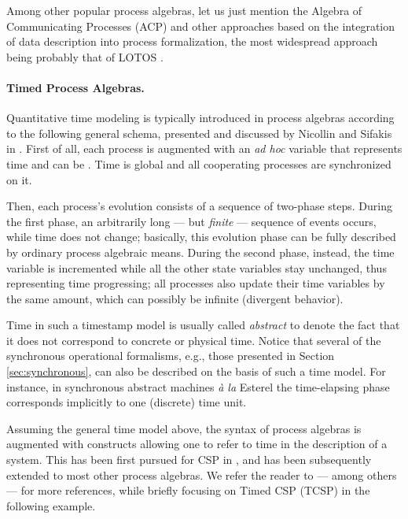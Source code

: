 Among other popular process algebras, let us just mention the 
Algebra of Communicating Processes (ACP) \cite{BW90} and other approaches 
based on the integration of data description into process formalization, 
the most widespread approach being probably that of LOTOS \cite{vEVD89,Bri89}.


\paragraph{Timed Process Algebras.}
Quantitative time modeling is typically introduced in process 
algebras according to the following general schema, presented 
and discussed by Nicollin and Sifakis in \cite{NS91}. First of all, 
each process is augmented with an \emph{ad hoc} variable that  
represents time and can be . Time is global and all cooperating processes 
are synchronized on it. 

Then, each process's evolution consists of a sequence of two-phase 
steps. During the first phase, an arbitrarily long --- but \emph{finite} 
--- sequence of events occurs, while time does not change; basically, 
this evolution phase can be fully described by ordinary process 
algebraic means. During the second phase, instead, the time variable 
is incremented while all the other state variables stay unchanged, 
thus representing time progressing; all processes also  
update their time variables by the same amount, which can possibly 
be infinite (divergent behavior).

Time in such a timestamp model is usually called \emph{abstract} 
to denote the fact that it does not correspond to concrete or 
physical time. Notice that several of the synchronous operational 
formalisms, e.g., those presented in Section \ref{sec:synchronous}, can also 
be described on the basis of such a time model. For instance, 
in synchronous abstract machines \emph{\`{a} la} Esterel \cite{BG92} the 
time-elapsing phase corresponds implicitly to one (discrete) 
time unit.

Assuming the general time model above, the syntax of process 
algebras is augmented with constructs allowing one to  
refer to  time in the description of a system. This 
has been first pursued for CSP in \cite{RR88}, and has been subsequently 
extended to most other process algebras. We refer the reader 
to \cite{BM02,NS91,Bae03} --- among others --- for more references, 
while briefly focusing on Timed CSP (TCSP) in the following example.

